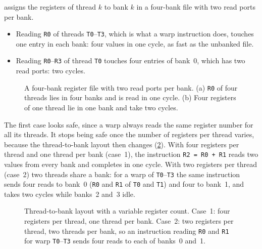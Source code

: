 \documentclass[../main.tex]{subfiles}
\begin{document}
 assigns the registers of thread
$k$ to bank $k$ in a four-bank file with two read ports per bank.
\begin{itemize}
  \item Reading \texttt{R0} of threads \texttt{T0}--\texttt{T3}, which
    is what a warp instruction does, touches one entry in each bank:
    four values in one cycle, as fast as the unbanked file.
  \item Reading \texttt{R0}--\texttt{R3} of thread \texttt{T0} touches
    four entries of bank~0, which has two read ports: two cycles.
\end{itemize}

\begin{figure}[htbp]
  \centering
  
  \caption{A four-bank register file with two read ports per bank.
    (a) \texttt{R0} of four threads lies in four banks and is read in
    one cycle.  (b) Four registers of one thread lie in one bank and
    take two cycles.}
  \label{fig:l04-register-bank-conflict}
\end{figure}

The first case looks safe, since a warp always reads the same register
number for all its threads.  It stops being safe once the number of
registers per thread varies, because the thread-to-bank layout then
changes (\cref{fig:l04-register-layout}).  With four registers per
thread and one thread per bank (case~1), the instruction
\texttt{R2 = R0 + R1} reads two values from every bank and completes in
one cycle.  With two registers per thread (case~2) two threads share a
bank: for a warp of \texttt{T0}--\texttt{T3} the same instruction sends
four reads to bank~0 (\texttt{R0} and \texttt{R1} of \texttt{T0} and
\texttt{T1}) and four to bank~1, and takes two cycles while banks~2
and~3 idle.

\begin{figure}[htbp]
  \centering
  
  \caption{Thread-to-bank layout with a variable register count.
    Case~1: four registers per thread, one thread per bank.  Case~2:
    two registers per thread, two threads per bank, so an instruction
    reading \texttt{R0} and \texttt{R1} for warp \texttt{T0}--\texttt{T3}
    sends four reads to each of banks~0 and~1.}
  \label{fig:l04-register-layout}
\end{figure}
\end{document}
